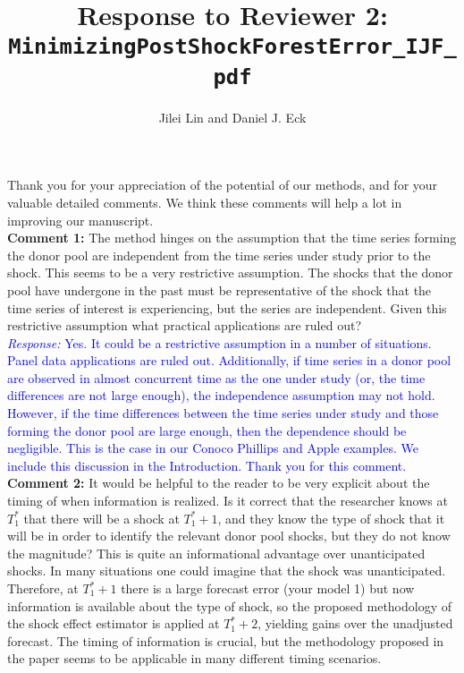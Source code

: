 \documentclass[12pt]{article}
\title{Response to Reviewer 2:  \texttt{MinimizingPostShockForestError\_IJF\_pdf}}
\author{Jilei Lin and Daniel J. Eck}
\date{}
\newcommand{\response}[1]{\noindent \textcolor{blue}{\emph{Response:} #1}}
\begin{document}
\maketitle

Thank you for your appreciation of the potential of our methods, and for your valuable detailed comments.  We think these comments will help a lot in improving our manuscript.\\

{\bf Comment 1:} The method hinges on the assumption that the time series forming the donor pool are independent from the time series under study prior to the shock. This seems to be a very restrictive assumption. The shocks that the donor pool have undergone in the past must be representative of the shock that the time series of interest is experiencing, but the series are independent. Given this restrictive assumption what practical applications are ruled out? \\

\response{Yes. It could be a restrictive assumption in a number of situations. Panel data applications are ruled out. Additionally, if time series in a donor pool are observed in almost concurrent time as the one under study (or, the time differences are not large enough), the independence assumption may not hold. However, if the time differences between the time series under study and those forming the donor pool are large enough, then the dependence should be negligible. This is the case in our Conoco Phillips and Apple examples. We include this discussion in the Introduction. Thank you for this comment.} \\

{\bf Comment 2:} It would be helpful to the reader to be very explicit about the timing of when information is realized. Is it correct that the researcher knows at $T_1^*$ that there will be a shock at $T_1^* + 1$, and they know the type of shock that it will be in order to identify the relevant donor pool shocks, but they do not know the magnitude? This is quite an informational advantage over unanticipated shocks. In many situations one could imagine that the shock was unanticipated. Therefore, at $T_1^* + 1$  there is a large forecast error (your model 1) but now information is available about the type of shock, so the proposed methodology of the shock effect estimator is applied at $T_1^* + 2$, yielding gains over the unadjusted forecast. The timing of information is crucial, but the methodology proposed in the paper seems to be applicable in many different timing scenarios. \\
\end{document}
